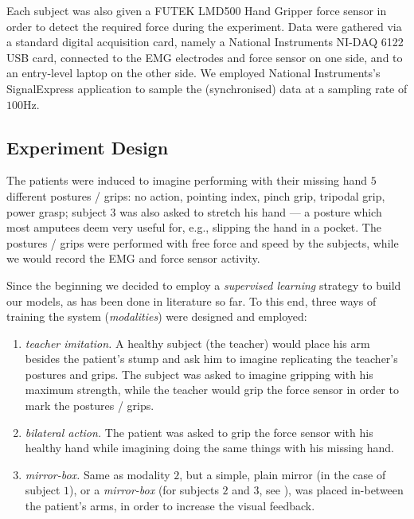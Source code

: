 Each subject was also given a FUTEK LMD500 Hand Gripper force sensor
\cite{futek} in order to detect the required force during the
experiment. Data were gathered via a standard digital acquisition
card, namely a National Instruments NI-DAQ 6122 USB card, connected to
the EMG electrodes and force sensor on one side, and to an entry-level
laptop on the other side. We employed National Instruments's
SignalExpress application to sample the (synchronised) data at a
sampling rate of $100$Hz.

\subsection{Experiment Design}

The patients were induced to imagine performing with their missing
hand $5$ different postures / grips: no action, pointing index, pinch
grip, tripodal grip, power grasp; subject $3$ was also asked to
stretch his hand --- a posture which most amputees deem very useful
for, e.g., slipping the hand in a pocket. The postures / grips were
performed with free force and speed by the subjects, while we would
record the EMG and force sensor activity.

Since the beginning we decided to employ a \emph{supervised learning}
strategy to build our models, as has been done in literature so
far. To this end, three ways of training the system
(\emph{modalities}) were designed and employed:

\begin{enumerate}

  \item \emph{teacher imitation.} A healthy subject (the teacher)
    would place his arm besides the patient's stump and ask him
    to imagine replicating the teacher's postures and grips. The
    subject was asked to imagine gripping with his maximum strength,
    while the teacher would grip the force sensor in order to mark the
    postures / grips.

  \item \emph{bilateral action.} The patient was asked to grip the
    force sensor with his healthy hand while imagining doing the same
    things with his missing hand.

  \item \emph{mirror-box.} Same as modality $2$, but a simple, plain
    mirror (in the case of subject $1$), or a \emph{mirror-box} (for
    subjects $2$ and $3$, see \cite{mirror-box}), was placed
    in-between the patient's arms, in order to increase the visual
    feedback.

\end{enumerate}

